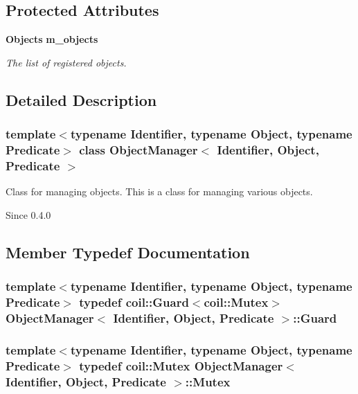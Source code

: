 \subsection*{Protected Attributes}
\begin{DoxyCompactItemize}
\item 
{\bf Objects} {\bf m\_\-objects}
\begin{DoxyCompactList}\small\item\em The list of registered objects. \item\end{DoxyCompactList}\end{DoxyCompactItemize}


\subsection{Detailed Description}
\subsubsection*{template$<$typename Identifier, typename Object, typename Predicate$>$ class ObjectManager$<$ Identifier, Object, Predicate $>$}

Class for managing objects. This is a class for managing various objects.

\begin{DoxySince}{Since}
0.4.0 
\end{DoxySince}


\subsection{Member Typedef Documentation}
\subsubsection[{Guard}]{\setlength{\rightskip}{0pt plus 5cm}template$<$typename Identifier, typename Object, typename Predicate$>$ typedef {\bf coil::Guard}$<${\bf coil::Mutex}$>$ {\bf ObjectManager}$<$ Identifier, Object, Predicate $>$::{\bf Guard}}\label{classObjectManager_a269f7c04878a5ad6759d2ff21a21c4d1}
\subsubsection[{Mutex}]{\setlength{\rightskip}{0pt plus 5cm}template$<$typename Identifier, typename Object, typename Predicate$>$ typedef {\bf coil::Mutex} {\bf ObjectManager}$<$ Identifier, Object, Predicate $>$::{\bf Mutex}}\label{classObjectManager_aace44eee2c2a6ddfec63ac42b7bf601c}

